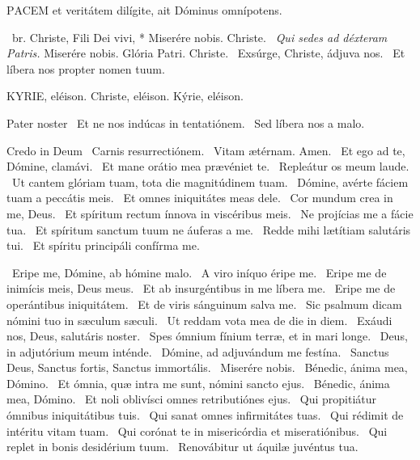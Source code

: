 

\lettrine[lines=2]{P}{ACEM} et veritátem dilígite, ait Dóminus omnípotens.

\R\ br. Christe, Fili Dei vivi, * Miserére nobis. Christe. \V\ \textit{Qui sedes ad déxteram Patris.} Miserére nobis. Glória Patri. Christe. \V\ Exsúrge, Christe, ádjuva nos. \R\ Et líbera nos propter nomen tuum.


KYRIE, eléison. Christe, eléison. Kýrie, eléison.

Pater noster  \V\ Et ne nos indúcas in tentatiónem. \R\ Sed líbera nos a malo.

Credo in Deum  \V\ Carnis resurrectiónem. \R\ Vitam ætérnam. Amen. \V\ Et ego ad te, Dómine, clamávi. \R\ Et mane orátio mea prævéniet te. \V\ Repleátur os meum laude. \R\ Ut cantem glóriam tuam, tota die magnitúdinem tuam. \V\ Dómine, avérte fáciem tuam a peccátis meis. \R\ Et omnes iniquitátes meas dele. \V\ Cor mundum crea in me, Deus. \R\ Et spíritum rectum ínnova in viscéribus meis. \V\ Ne projícias me a fácie tua. \R\ Et spíritum sanctum tuum ne áuferas a me. \V\ Redde mihi lætítiam salutáris tui. \R\ Et spíritu principáli confírma me.


\V\ Eripe me, Dómine, ab hómine malo. \R\ A viro iníquo éripe me. \V\ Eripe me de inimícis meis, Deus meus. \R\ Et ab insurgéntibus in me líbera me. \V\ Eripe me de operántibus iniquitátem. \R\ Et de viris sánguinum salva me. \V\ Sic psalmum dicam nómini tuo in sæculum sæculi. \R\ Ut reddam vota mea de die in diem. \V\ Exáudi nos, Deus, salutáris noster. \R\ Spes ómnium fínium terræ, et in mari longe. \V\ Deus, in adjutórium meum inténde. \R\ Dómine, ad adjuvándum me festína. \V\ Sanctus Deus, Sanctus fortis, Sanctus immortális. \R\ Miserére nobis. \V\ Bénedic, ánima mea, Dómino. \R\ Et ómnia, quæ intra me sunt, nómini sancto ejus. \V\ Bénedic, ánima mea, Dómino. \R\ Et noli oblivísci omnes retributiónes ejus. \V\ Qui propitiátur ómnibus iniquitátibus tuis. \R\ Qui sanat omnes infirmitátes tuas. \V\ Qui rédimit de intéritu vitam tuam. \R\ Qui corónat te in misericórdia et miseratiónibus. \V\ Qui replet in bonis desidérium tuum. \R\ Renovábitur ut áquilæ juvéntus tua.

